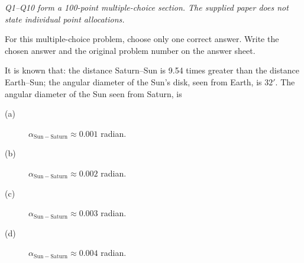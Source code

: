 \textit{Q1--Q10 form a 100-point multiple-choice section. The supplied paper
does not state individual point allocations.}

For this multiple-choice problem, choose only one correct answer. Write the
chosen answer and the original problem number on the answer sheet.

It is known that: the distance Saturn--Sun is 9.54 times greater than the
distance Earth--Sun; the angular diameter of the Sun's disk, seen from Earth,
is $32'$.
The angular diameter of the Sun seen from Saturn, is
\begin{description}
\item[(a)] $\alpha_{\mathrm{Sun-Saturn}}\approx0.001$ radian.
\item[(b)] $\alpha_{\mathrm{Sun-Saturn}}\approx0.002$ radian.
\item[(c)] $\alpha_{\mathrm{Sun-Saturn}}\approx0.003$ radian.
\item[(d)] $\alpha_{\mathrm{Sun-Saturn}}\approx0.004$ radian.
\end{description}
